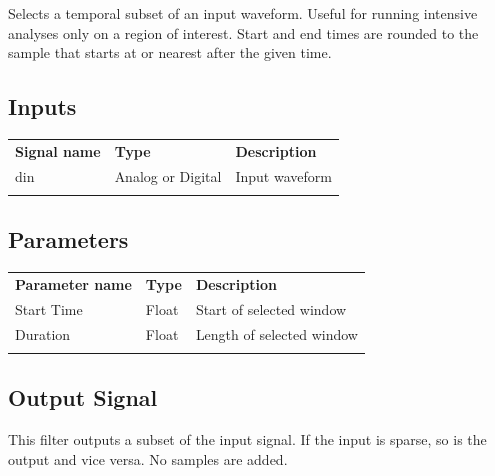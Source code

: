 Selects a temporal subset of an input waveform. Useful for running intensive analyses only on a region of interest.
Start and end times are rounded to the sample that starts at or nearest after the given time.

\subsection{Inputs}

\begin{tabularx}{16cm}{llX}
\thickhline
\textbf{Signal name} & \textbf{Type} & \textbf{Description} \\
\thickhline
din & Analog or Digital & Input waveform \\
\thickhline
\end{tabularx}

\subsection{Parameters}

\begin{tabularx}{16cm}{llX}
\thickhline
\textbf{Parameter name} & \textbf{Type} & \textbf{Description} \\
\thickhline
Start Time & Float & Start of selected window \\
\thinhline
Duration & Float & Length of selected window \\
\thickhline
\end{tabularx}

\subsection{Output Signal}

This filter outputs a subset of the input signal. If the input is sparse, so is the output and vice versa. No samples
are added.
